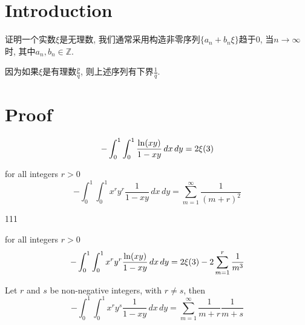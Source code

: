 %

\chapter{Introduction}

证明一个实数$\xi$是无理数, 我们通常采用构造非零序列$\{a_n + b_n\xi\}$趋于$0$, 当$n \rightarrow \infty$时, 其中$a_n, b_n \in \mathbb{Z}$.

因为如果$\xi$是有理数$\frac{p}{q}$, 则上述序列有下界$\frac{1}{q}$.

\chapter{Proof}

\begin{lemma}\label{integral_zeta_3}
    \[ -\int_{0}^{1}\int_{0}^{1} \frac{{\rm ln}(xy)}{1-xy} \, dx \, dy = 2\xi(3) \]
\end{lemma}

\begin{lemma}\label{I_rr}
    for all integers $r > 0$
    \[ -\int_{0}^{1}\int_{0}^{1} x^ry^r\frac{1}{1-xy} \, dx \, dy = \sum\limits_{m = 1}^{\infty}\frac{1}{(m+r)^2} \]
\end{lemma}

\begin{lemma}\label{interchange_of_limits_sums_derivatives}
    111
\end{lemma}

\begin{lemma}\label{J_rr}
    for all integers $r > 0$
    \[ -\int_{0}^{1}\int_{0}^{1} x^ry^r\frac{{\rm ln}(xy)}{1-xy} \, dx \, dy = 2\xi(3) - 2 \sum\limits_{m = 1}^{r}\frac{1}{m^3} \]
\end{lemma}

\begin{lemma}\label{I_rs}
    Let $r$ and $s$ be non-negative integers, with $r \neq s$, then
    \[ -\int_{0}^{1}\int_{0}^{1} x^ry^s\frac{1}{1-xy} \, dx \, dy = \sum\limits_{m = 1}^{\infty}\frac{1}{m+r}\frac{1}{m+s} \]
\end{lemma}

